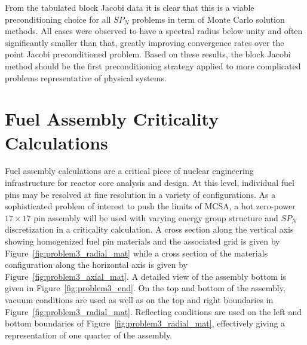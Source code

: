 From the tabulated block Jacobi data it is clear that this is a viable
preconditioning choice for all $SP_N$ problems in term of Monte Carlo
solution methods. All cases were observed to have a spectral radius
below unity and often significantly smaller than that, greatly
improving convergence rates over the point Jacobi preconditioned
problem. Based on these results, the block Jacobi method should be the
first preconditioning strategy applied to more complicated problems
representative of physical systems.
\clearpage

\section{Fuel Assembly Criticality Calculations}
\label{sec:fuel_assembly_calcs}
Fuel assembly calculations are a critical piece of nuclear engineering
infrastructure for reactor core analysis and design. At this level,
individual fuel pins may be resolved at fine resolution in a variety
of configurations. As a sophisticated problem of interest to push the
limits of MCSA, a hot zero-power $17 \times 17$ pin assembly will be
used with varying energy group structure and $SP_N$ discretization in
a criticality calculation. A cross section along the vertical axis
showing homogenized fuel pin materials and the associated grid is
given by Figure~\ref{fig:problem3_radial_mat} while a cross section of
the materials configuration along the horizontal axis is given by
Figure~\ref{fig:problem3_axial_mat}. A detailed view of the assembly
bottom is given in Figure~\ref{fig:problem3_end}. On the top and
bottom of the assembly, vacuum conditions are used as well as on the
top and right boundaries in
Figure~\ref{fig:problem3_radial_mat}. Reflecting conditions are used
on the left and bottom boundaries of
Figure~\ref{fig:problem3_radial_mat}, effectively giving a
representation of one quarter of the assembly.
